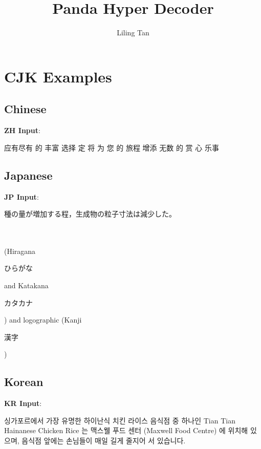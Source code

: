 \documentclass[11pt]{article}
\title{\textbf{Panda Hyper Decoder}}
\author{Liling Tan}
\date{}
\newenvironment{korean}{%
  \CJKfamily{mj}}{}
\begin{document}
\maketitle

\newpage
\section{CJK Examples}

\subsection{Chinese}
\textbf{ZH Input}: \begin{CJK*}{UTF8}{gbsn}应有尽有 的 丰富 选择 定 将 为 您 的 旅程 增添 无数 的 赏 心 乐事\end{CJK*}

\subsection{Japanese}
\textbf{JP Input}: \begin{CJK*}{UTF8}{min}種の量が増加する程，生成物の粒子寸法は減少した。\end{CJK*}
\\ \\
(Hiragana \begin{CJK*}{UTF8}{min}ひらがな\end{CJK*} and Katakana \begin{CJK*}{UTF8}{min}カタカナ\end{CJK*}) and logographic (Kanji \begin{CJK*}{UTF8}{min}漢字\end{CJK*})

\subsection{Korean}
\textbf{KR Input}: \begin{CJK*}{UTF8}{}\begin{korean}싱가포르에서 가장 유명한 하이난식 치킨 라이스 음식점 중 하나인 Tian Tian Hainanese Chicken Rice 는 맥스웰 푸드 센터 (Maxwell Food Centre) 에 위치해 있으며, 음식점 앞에는 손님들이 매일 길게 줄지어 서 있습니다. \end{korean} \end{CJK*}
\end{document}
